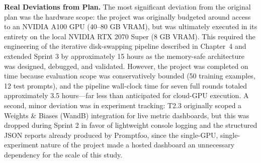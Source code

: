 \documentclass[11pt, a4paper]{article}
\begin{document}
\textbf{Real Deviations from Plan.} The most significant deviation from the original plan was the hardware scope: the project was originally budgeted around access to an NVIDIA A100 GPU (40--80 GB VRAM), but was ultimately executed in its entirety on the local NVIDIA RTX 2070 Super (8 GB VRAM). This required the engineering of the iterative disk-swapping pipeline described in Chapter~4 and extended Sprint 3 by approximately 15 hours as the memory-safe architecture was designed, debugged, and validated. However, the project was completed on time because evaluation scope was conservatively bounded (50 training examples, 12 test prompts), and the pipeline wall-clock time for seven full rounds totaled approximately 3.5 hours---far less than anticipated for cloud-GPU execution. A second, minor deviation was in experiment tracking: T2.3 originally scoped a Weights \& Biases (WandB) integration for live metric dashboards, but this was dropped during Sprint 2 in favor of lightweight console logging and the structured JSON reports already produced by Promptfoo, since the single-GPU, single-experiment nature of the project made a hosted dashboard an unnecessary dependency for the scale of this study.
\end{document}
